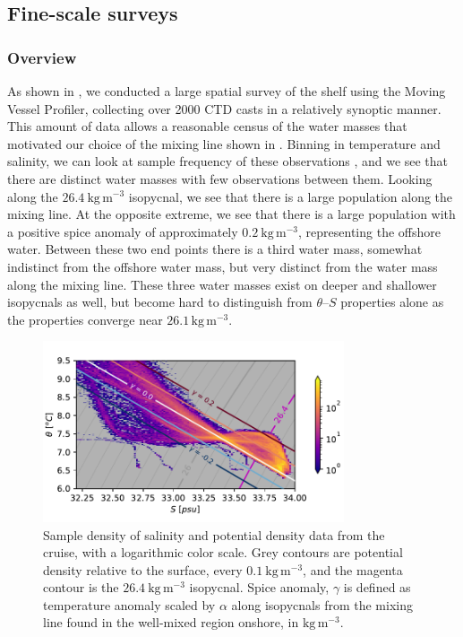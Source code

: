 \documentclass[draft]{agujournal2019}
\begin{document}
\subsection{Fine-scale surveys}

\subsubsection{Overview}

As shown in ,  we conducted a large spatial survey of the shelf using the Moving Vessel Profiler, collecting over 2000 CTD casts in a relatively synoptic manner.  This amount of data allows a reasonable census of the water masses that motivated our choice of the mixing line shown in .  Binning in temperature and salinity, we can look at sample frequency of these observations , and we see that there are distinct water masses with few observations between them. Looking along the $26.4\ \mathrm{kg\,m^{-3}}$ isopycnal, we see that there is a large population along the mixing line.  At the opposite extreme, we see that there is a large population with a positive spice anomaly of approximately $0.2\ \mathrm{kg\,m^{-3}}$, representing the offshore water.  Between these two end points there is a third water mass, somewhat indistinct from the offshore water mass, but very distinct from the water mass along the mixing line.  These three water masses exist on deeper and shallower isopycnals as well, but become hard to distinguish from $\theta$--$S$ properties alone as the properties converge near $26.1\,\mathrm{kg\,m^{-3}}$.


\begin{figure}[htbp]
  \begin{center}

     \includegraphics[width=3.5in]{TSdensSpice.pdf}
    \caption{Sample density of salinity and potential density data from the cruise, with a logarithmic color scale.  Grey contours are potential density relative to the surface, every $0.1\ \mathrm{kg\,m^{-3}}$, and the magenta contour is the $26.4\ \mathrm{kg\,m^{-3}}$ isopycnal.  Spice anomaly, $\gamma$ is defined as temperature anomaly scaled by $\alpha$ along isopycnals from the mixing line found in the well-mixed region onshore, in $\mathrm{kg\,m^{-3}}$.
    \label{fig:TSdensSpice}}
  \end{center}
\end{figure}
\end{document}
